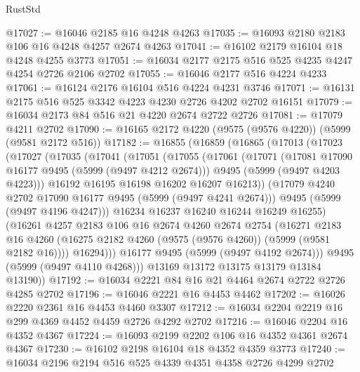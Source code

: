 \begin{lexlean}{RustStd}
\begin{coremodule}
@17027 := @16046 @2185 @16 @4248 @4263
@17035 := @16093 @2180 @2183 @106 @16 @4248 @4257 @2674 @4263
@17041 := @16102 @2179 @16104 @18 @4248 @4255 @3773
@17051 := @16034 @2177 @2175 @516 @525 @4235 @4247 @4254 @2726 @2106 @2702
@17055 := @16046 @2177 @516 @4224 @4233
@17061 := @16124 @2176 @16104 @516 @4224 @4231 @3746
@17071 := @16131 @2175 @516 @525 @3342 @4223 @4230 @2726 @4202 @2702 @16151
@17079 := @16034 @2173 @84 @516 @21 @4220 @2674 @2722 @2726
@17081 := @17079 @4211 @2702
@17090 := @16165 @2172 @4220 (@9575 (@9576 @4220)) (@5999 (@9581 @2172 @516))
@17182 := @16855
    (@16859
      (@16865
        (@17013
          (@17023
            (@17027
              (@17035
                (@17041
                  (@17051
                    (@17055
                      (@17061
                        (@17071
                          (@17081 @17090 @16177 @9495 (@5999 (@9497 @4212 @2674)))
                          @9495
                          (@5999 (@9497 @4203 @4223)))
                        @16192
                        @16195
                        @16198
                        @16202
                        @16207
                        @16213))
                    (@17079 @4240 @2702 @17090 @16177 @9495 (@5999 (@9497 @4241 @2674)))
                    @9495
                    (@5999 (@9497 @4196 @4247)))
                  @16234
                  @16237
                  @16240
                  @16244
                  @16249
                  @16255)
                (@16261
                  @4257
                  @2183
                  @106
                  @16
                  @2674
                  @4260
                  @2674
                  @2754
                  (@16271
                    @2183
                    @16
                    @4260
                    (@16275 @2182 @4260 (@9575 (@9576 @4260)) (@5999 (@9581 @2182 @16))))
                  @16294)))
            @16177
            @9495
            (@5999 (@9497 @4192 @2674)))
          @9495
          (@5999 (@9497 @4110 @4268)))
        @13169
        @13172
        @13175
        @13179
        @13184
        @13190))
@17192 := @16034 @2221 @84 @16 @21 @4464 @2674 @2722 @2726 @4285 @2702
@17196 := @16046 @2221 @16 @4453 @4462
@17202 := @16026 @2220 @2361 @16 @4453 @4460 @3307
@17212 := @16034 @2204 @2219 @16 @299 @4369 @4452 @4459 @2726 @4292 @2702
@17216 := @16046 @2204 @16 @4352 @4367
@17224 := @16093 @2199 @2202 @106 @16 @4352 @4361 @2674 @4367
@17230 := @16102 @2198 @16104 @18 @4352 @4359 @3773
@17240 := @16034 @2196 @2194 @516 @525 @4339 @4351 @4358 @2726 @4299 @2702

\end{coremodule}
\end{lexlean}
